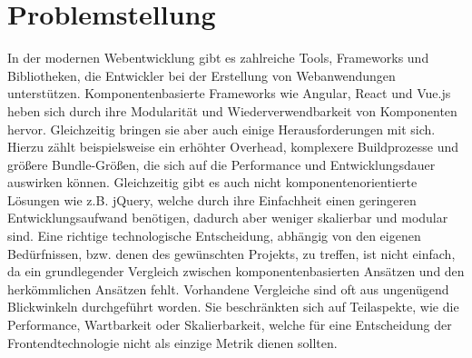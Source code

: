 \documentclass[oneside]{ausarbeitung}
\begin{document}
\section{Problemstellung}
\label{sec:problemstellung}

In der modernen Webentwicklung gibt es zahlreiche Tools, Frameworks und Bibliotheken, die Entwickler bei der Erstellung von Webanwendungen unterstützen. Komponentenbasierte Frameworks wie Angular, React und Vue.js heben sich durch ihre Modularität und Wiederverwendbarkeit von Komponenten hervor. Gleichzeitig bringen sie aber auch einige Herausforderungen mit sich. Hierzu zählt beispielsweise ein erhöhter Overhead, komplexere Buildprozesse und größere Bundle-Größen, die sich auf die Performance und Entwicklungsdauer auswirken können.
Gleichzeitig gibt es auch nicht komponentenorientierte Lösungen wie z.B. jQuery, welche durch ihre Einfachheit einen geringeren Entwicklungsaufwand benötigen, dadurch aber weniger skalierbar und modular sind. 
Eine richtige technologische Entscheidung, abhängig von den eigenen Bedürfnissen, bzw. denen des gewünschten Projekts, zu treffen, ist nicht einfach, da ein grundlegender Vergleich zwischen komponentenbasierten Ansätzen und den herkömmlichen Ansätzen fehlt. Vorhandene Vergleiche sind oft aus ungenügend Blickwinkeln durchgeführt worden. Sie beschränkten sich auf Teilaspekte, wie die Performance, Wartbarkeit oder Skalierbarkeit, welche für eine Entscheidung der Frontendtechnologie nicht als einzige Metrik dienen sollten. 
\end{document}
